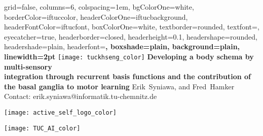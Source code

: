 \documentclass[portrait,final,a0paper,fontscale=0.33]{baposter}
\begin{document}
\begin{poster}%
	{
		grid=false,
		columns=6,
		colspacing=1em,
		bgColorOne=white,
		borderColor=iftuccolor,
		headerColorOne=iftucbackground,
		headerFontColor=iftucfont,
		boxColorOne=white,
		textborder=rounded,
		textfont=\small,
		eyecatcher=true,
		headerborder=closed,
		headerheight=0.1\textheight,
		headershape=rounded,
		headershade=plain,
		headerfont=\Large\bf, %
		boxshade=plain,
		background=plain,
		linewidth=2pt
	}
	{\texttt{[image: tuckhseng\_color]}} 
	{\bf\Large{Developing a body schema by multi-sensory\\ integration through recurrent basis functions and the contribution of the basal ganglia to motor learning}\vspace{5pt}}
	{\large Erik~Syniawa, and Fred~Hamker \\ \vspace{0.5em}
	\small Contact: erik.syniawa@informatik.tu-chemnitz.de
	}
	{	
		\begin{minipage}[r]{0.1\textwidth}
			\texttt{[image: active\_self\_logo\_color]}
		\end{minipage}
		\hfill
		\begin{minipage}[r]{0.1\textwidth}
			\texttt{[image: TUC\_AI\_color]}
		\end{minipage}
		
	}

\end{poster}
\end{document}
